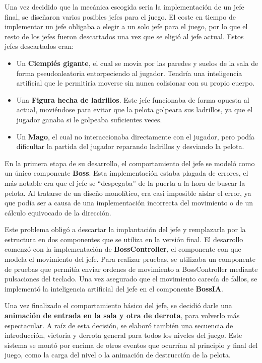 Una vez decidido que la mecánica escogida seria la implementación de un jefe final, se diseñaron varios posibles jefes para el juego. El coste en tiempo de implementar un jefe obligaba a elegir a un solo jefe para el juego, por lo que el resto de los jefes fueron descartados una vez que se eligió al jefe actual. Estos jefes descartados eran:
\begin{itemize}
\item Un \textbf{Ciempiés gigante}, el cual se movía por las paredes y suelos de la sala de forma pseudoaleatoria entorpeciendo al jugador. Tendría una inteligencia artificial que le permitiría moverse sin nunca colisionar con su propio cuerpo.
\item Una \textbf{Figura hecha de ladrillos}. Este jefe funcionaba de forma opuesta al actual, moviéndose para evitar que la pelota golpeara sus ladrillos, ya que el jugador ganaba si le golpeaba suficientes veces.
\item Un \textbf{Mago}, el cual no interaccionaba directamente con el jugador, pero podía dificultar la partida del jugador reparando ladrillos y desviando la pelota.
\end{itemize}

En la primera etapa de su desarrollo, el comportamiento del jefe se modeló como un único componente \textbf{Boss}. Esta implementación estaba plagada de errores, el más notable era que el jefe se ``despegaba'' de la puerta a la hora de buscar la pelota. Al tratarse de un diseño monolítico, era casi imposible aislar el error, ya que podía ser a causa de una implementación incorrecta del movimiento o de un cálculo equivocado de la dirección. 

Este problema obligó a descartar la implantación del jefe y remplazarla por la estructura en dos componentes que se utiliza en la versión final. El desarrollo comenzó con la implementación de \textbf{BossController}, el componente con que modela el movimiento del jefe. Para realizar pruebas, se utilizaba un componente de pruebas que permitía enviar ordenes de movimiento a BossController mediante pulsaciones del teclado. Una vez asegurado que el movimiento carecía de fallos, se implementó la inteligencia artificial del jefe en el componente \textbf{BossIA}.

Una vez finalizado el comportamiento básico del jefe, se decidió darle una \textbf{animación de entrada en la sala y otra de derrota}, para volverlo más espectacular. A raíz de esta decisión, se elaboró también una secuencia de introducción, victoria y derrota general para todos los niveles del juego. Este sistema se montó por encima de otros eventos que ocurrían al principio y final del juego, como la carga del nivel o la animación de destrucción de la pelota.

